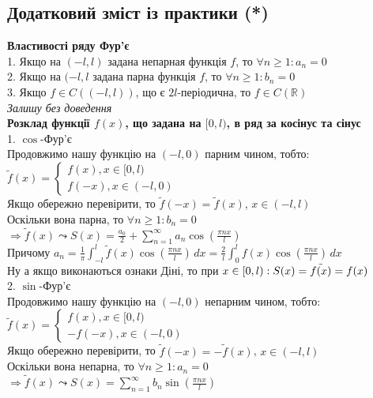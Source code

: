 \documentclass[a4paper, 10pt]{article}
\def\hugespace{\vspace{5mm} \\}
\theoremstyle{theoremdd}
\theoremstyle{theoremdd}
\theoremstyle{theoremdd}
\theoremstyle{theoremdd}
\theoremstyle{theoremdd}
\theoremstyle{theoremdd}
\theoremstyle{theoremdd}
\theoremstyle{theoremdd}
\begin{document}
\subsection{Додатковий зміст із практики (*)}
\textbf{Властивості ряду Фур'є}\\
1. Якщо на $(-l,l)$ задана непарная функція $f$, то $\forall n \geq 1: a_n = 0$\\
2. Якщо на $(-l,l$ задана парна функція $f$, то $\forall n \geq 1: b_n = 0$\\
3. Якщо $f \in C((-l,l))$, що є $2l$-періодична, то $f \in C(\mathbb{R})$\\
\textit{Залишу без доведення}
\hugespace
\textbf{Розклад функції $f(x)$, що задана на $[0,l)$, в ряд за косінус та сінус}\\
1. $\cos$-Фур'є\\
Продовжимо нашу функцію на $(-l,0)$ парним чином, тобто:\\
$\tilde{f}(x) = \begin{cases} f(x), x \in [0,l) \\ f(-x), x \in (-l,0) \end{cases}$\\
Якщо обережно перевірити, то $\tilde{f}(-x)=\tilde{f}(x)$, $x \in (-l,l)$\\
Оскільки вона парна, то $\forall n \geq 1: b_n = 0$\\
$\Rightarrow \tilde{f}(x) \leadsto S(x) = \displaystyle \frac{a_0}{2} + \sum_{n=1}^{\infty} a_n \cos \left( \frac{\pi n x}{l} \right)$\\
Причому $a_n = \displaystyle \frac{1}{\pi} \int_{-l}^{l} \tilde{f}(x) \cos \left( \frac{\pi n x}{l} \right) \,dx = \frac{2}{l} \int_0^l f(x) \cos \left( \frac{\pi n x}{l} \right)\,dx$\\
Ну а якщо виконаються ознаки Діні, то при $x \in [0,l): \\ S(x) = \tilde{f(x)} = f(x)$
\hugespace
2. $\sin$-Фур'є\\
Продовжимо нашу функцію на $(-l,0)$ непарним чином, тобто:\\
$\tilde{f}(x) = \begin{cases} f(x), x \in [0,l) \\ -f(-x), x \in (-l,0) \end{cases}$\\
Якщо обережно перевірити, то $\tilde{f}(-x)=-\tilde{f}(x)$, $x \in (-l,l)$\\
Оскільки вона непарна, то $\forall n \geq 1: a_n = 0$\\
$\Rightarrow \tilde{f}(x) \leadsto S(x) = \displaystyle \sum_{n=1}^{\infty} b_n \sin \left( \frac{\pi n x}{l} \right)$\\
\end{document}

